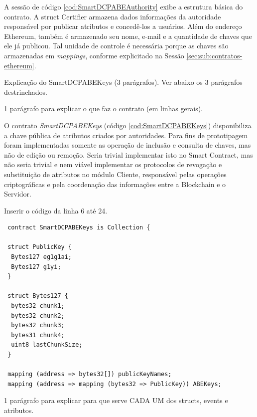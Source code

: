 \documentclass[a4paper,11pt]{article}
\begin{document}
A sessão de código \ref{cod:SmartDCPABEAuthority} exibe a estrutura básica do contrato.
A struct Certifier armazena dados informações da autoridade responsável por publicar atributos e concedê-los a usuários.
Além do endereço Ethereum, também é armazenado seu nome, e-mail e a quantidade de chaves que ele já publicou.
Tal unidade de controle é necessária porque as chaves são armazenadas em \emph{mappings}, conforme explicitado na Sessão \ref{sec:sub:contratos-ethereum}.

{\color{ForestGreen} Explicação do  SmartDCPABEKeys (3 parágrafos). Ver abaixo os 3 parágrafos destrinchados.}

{\color{Magenta} 1 parágrafo para explicar o que faz o contrato (em linhas gerais).}

O contrato \emph{SmartDCPABEKeys} (código \ref{cod:SmartDCPABEKeys}) disponibiliza a chave pública de atributos criados por autoridades.
Para fins de prototipagem foram implementadas somente as operação de inclusão e consulta de chaves, mas não de edição ou remoção.
Seria trivial implementar isto no Smart Contract, mas não seria trivial e nem viável implementar os protocolos de revogação e substituição de atributos no módulo Cliente, responsável pelas operações criptográficas e pela coordenação das informações entre a Blockchain e o Servidor.

{\color{Magenta} Inserir o código da linha 6 até 24.}

\begin{lstlisting}
 contract SmartDCPABEKeys is Collection {

 struct PublicKey {
  Bytes127 eg1g1ai;
  Bytes127 g1yi;
 }

 struct Bytes127 {
  bytes32 chunk1;
  bytes32 chunk2;
  bytes32 chunk3;
  bytes31 chunk4;
  uint8 lastChunkSize;
 }

 mapping (address => bytes32[]) publicKeyNames;
 mapping (address => mapping (bytes32 => PublicKey)) ABEKeys;
\end{lstlisting}

{\color{Magenta} 1 parágrafo para explicar para que serve CADA UM dos structs, events e atributos.}
\end{document}
